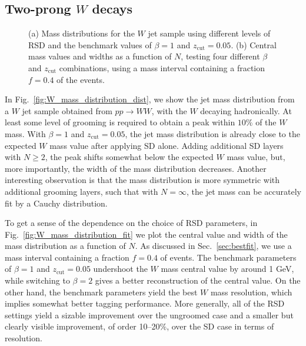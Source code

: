 \documentclass[11pt,a4paper]{article}
\newcommand{\zcut}{z_\text{cut}}
\DeclareRobustCommand{\Sec}[1]{Sec.~\ref{#1}}
\DeclareRobustCommand{\Fig}[1]{Fig.~\ref{#1}}
\begin{document}
\subsection{Two-prong $W$ decays}
\label{sec:W_mass}


\begin{figure}[t]
  \centering
  \qquad
  \caption{(a) Mass distributions for the $W$ jet sample using different levels of RSD and the benchmark values of $\beta = 1$ and $\zcut =0.05$.  (b) Central mass values and widths as a function of $N$, testing four different $\beta$ and $\zcut$ combinations, using a mass interval containing a fraction $f=0.4$ of the events.
  }
  \label{fig:W_mass_distribution}
\end{figure}

In \Fig{fig:W_mass_distribution_dist}, we show the jet mass distribution from a $W$ jet sample obtained from $pp \to WW$, with the $W$ decaying hadronically.
%
At least some level of grooming is required to obtain a peak within $10\%$ of the $W$ mass.
%
With $\beta = 1$ and $\zcut =0.05$, the jet mass distribution is already close to the expected $W$ mass value after applying SD alone.
%
Adding additional SD layers with $N \geq 2$, the peak shifts somewhat
below the expected $W$ mass value, but, more importantly, the width of
the mass distribution decreases.
%
%
Another interesting observation is that
the mass distribution is more symmetric 
with additional grooming layers, such that with $N=\infty$, the jet
mass can be accurately fit by a Cauchy distribution.

To get a sense of the dependence on the choice of RSD parameters, in \Fig{fig:W_mass_distribution_fit} we plot the central value and width of the mass distribution as a function of $N$.
%
As discussed in \Sec{sec:bestfit}, we use a mass interval containing a fraction $f=0.4$ of events.
%
The benchmark parameters of $\beta=1$ and  $z_{\text{cut}}=0.05$ undershoot the $W$ mass central value by around 1 GeV, while switching to $\beta=2$ gives a better reconstruction of the central value.
%
On the other hand, the benchmark parameters yield the best $W$ mass resolution, which implies somewhat better tagging performance.
%
More generally, all of the RSD settings yield a sizable improvement
over the ungroomed case and a smaller but clearly visible improvement,
of order 10--20\%, over the SD case in terms of resolution.
\end{document}
